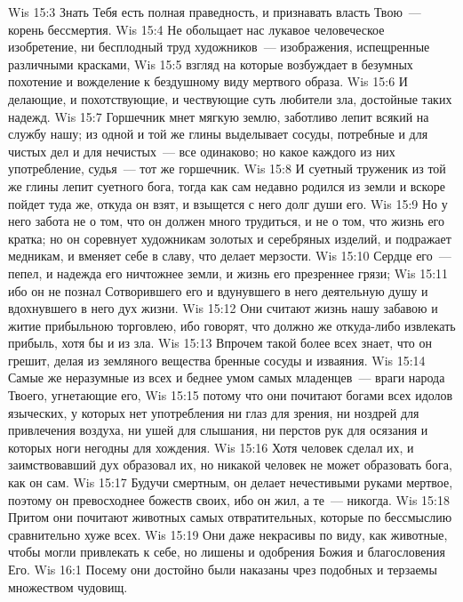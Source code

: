 \vs Wis 15:3 Знать Тебя есть полная праведность, и признавать власть Твою~--- корень бессмертия.
\vs Wis 15:4 Не обольщает нас лукавое человеческое изобретение, ни бесплодный труд художников~--- изображения, испещренные различными красками,
\vs Wis 15:5 взгляд на которые возбуждает в безумных похотение и вожделение к бездушному виду мертвого образа.
\vs Wis 15:6 И делающие, и похотствующие, и чествующие суть любители зла, достойные таких надежд.
\vs Wis 15:7 Горшечник мнет мягкую землю, заботливо лепит всякий  на службу нашу; из одной и той же глины выделывает сосуды, потребные и для чистых дел и для нечистых~--- все одинаково; но какое каждого из них употребление, судья~--- тот же горшечник.
\vs Wis 15:8 И суетный труженик из той же глины лепит суетного бога, тогда как сам недавно родился из земли и вскоре пойдет туда же, откуда он взят, и взыщется с него долг души его.
\vs Wis 15:9 Но у него забота не о том, что он должен много трудиться, и не о том, что жизнь его кратка; но он соревнует художникам золотых и серебряных изделий, и подражает медникам, и вменяет себе в славу, что делает мерзости.
\vs Wis 15:10 Сердце его~--- пепел, и надежда его ничтожнее земли, и жизнь его презреннее грязи;
\vs Wis 15:11 ибо он не познал Сотворившего его и вдунувшего в него деятельную душу и вдохнувшего в него дух жизни.
\vs Wis 15:12 Они считают жизнь нашу забавою и житие прибыльною торговлею, ибо говорят, что должно же откуда-либо извлекать прибыль, хотя бы и из зла.
\vs Wis 15:13 Впрочем такой более всех знает, что он грешит, делая из земляного вещества бренные сосуды и изваяния.
\vs Wis 15:14 Самые же неразумные из всех и беднее умом самых младенцев~--- враги народа Твоего, угнетающие его,
\vs Wis 15:15 потому что они почитают богами всех идолов языческих, у которых нет употребления ни глаз для зрения, ни ноздрей для привлечения воздуха, ни ушей для слышания, ни перстов рук для осязания и которых ноги негодны для хождения.
\vs Wis 15:16 Хотя человек сделал их, и заимствовавший дух образовал их, но никакой человек не может образовать бога, как он сам.
\vs Wis 15:17 Будучи смертным, он делает нечестивыми руками мертвое, поэтому он превосходнее божеств своих, ибо он жил, а те~--- никогда.
\vs Wis 15:18 Притом они почитают животных самых отвратительных, которые по бессмыслию сравнительно хуже всех.
\vs Wis 15:19 Они даже некрасивы по виду, как  животные, чтобы могли привлекать к себе, но лишены и одобрения Божия и благословения Его.
\vs Wis 16:1 Посему они достойно были наказаны чрез подобных  и терзаемы множеством чудовищ.
